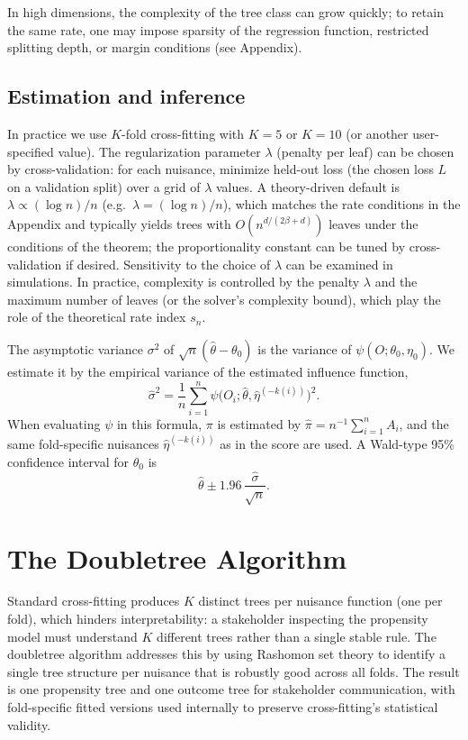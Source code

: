 \documentclass[12pt]{article}
\begin{document}
In high dimensions, the complexity of the tree class can grow quickly; to retain the same rate, one may impose sparsity of the regression function, restricted splitting depth, or margin conditions (see Appendix).

\subsection{Estimation and inference}

In practice we use $K$-fold cross-fitting with $K = 5$ or $K = 10$ (or another user-specified value). The regularization parameter $\lambda$ (penalty per leaf) can be chosen by cross-validation: for each nuisance, minimize held-out loss (the chosen loss $L$ on a validation split) over a grid of $\lambda$ values. A theory-driven default is $\lambda \propto (\log n)/n$ (e.g.\ $\lambda = (\log n)/n$), which matches the rate conditions in the Appendix and typically yields trees with $O(n^{d/(2\beta+d)})$ leaves under the conditions of the theorem; the proportionality constant can be tuned by cross-validation if desired. Sensitivity to the choice of $\lambda$ can be examined in simulations. In practice, complexity is controlled by the penalty $\lambda$ and the maximum number of leaves (or the solver's complexity bound), which play the role of the theoretical rate index $s_n$.

The asymptotic variance $\sigma^2$ of $\sqrt{n}(\hat\theta - \theta_0)$ is the variance of $\psi(O; \theta_0, \eta_0)$. We estimate it by the empirical variance of the estimated influence function,
\begin{equation}
\hat\sigma^2 = \frac{1}{n} \sum_{i=1}^n \psi\bigl(O_i; \hat\theta, \hat\eta^{(-k(i))}\bigr)^2.
\end{equation}
When evaluating $\psi$ in this formula, $\pi$ is estimated by $\hat{\pi} = n^{-1} \sum_{i=1}^n A_i$, and the same fold-specific nuisances $\hat{\eta}^{(-k(i))}$ as in the score are used. A Wald-type 95\% confidence interval for $\theta_0$ is
\begin{equation}
\hat\theta \pm 1.96 \, \frac{\hat\sigma}{\sqrt{n}}.
\end{equation}

\section{The Doubletree Algorithm}
\label{sec:rashomon}

Standard cross-fitting produces $K$ distinct trees per nuisance function (one per fold), which hinders interpretability: a stakeholder inspecting the propensity model must understand $K$ different trees rather than a single stable rule. The doubletree algorithm addresses this by using Rashomon set theory to identify a single tree structure per nuisance that is robustly good across all folds. The result is one propensity tree and one outcome tree for stakeholder communication, with fold-specific fitted versions used internally to preserve cross-fitting's statistical validity.
\end{document}
